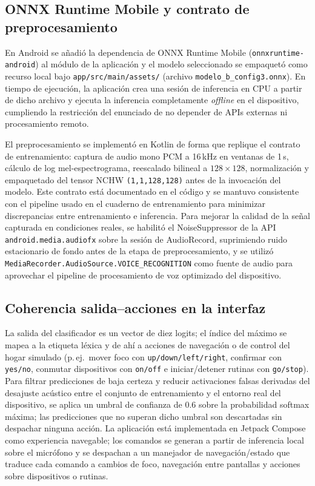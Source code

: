 \documentclass[conference]{IEEEtran}
\begin{document}
\subsection{ONNX Runtime Mobile y contrato de preprocesamiento}
En Android se a\~nadi\'o la dependencia de ONNX Runtime Mobile (\texttt{onnxruntime-android}) al m\'odulo de la aplicaci\'on y el modelo seleccionado se empaquet\'o como recurso local bajo \texttt{app/src/main/assets/} (archivo \texttt{modelo\_b\_config3.onnx}). En tiempo de ejecuci\'on, la aplicaci\'on crea una sesi\'on de inferencia en CPU a partir de dicho archivo y ejecuta la inferencia completamente \emph{offline} en el dispositivo, cumpliendo la restricci\'on del enunciado de no depender de APIs externas ni procesamiento remoto.

El preprocesamiento se implement\'o en Kotlin de forma que replique el contrato de entrenamiento: captura de audio mono PCM a 16\,kHz en ventanas de 1\,s, c\'alculo de log mel-espectrograma, reescalado bilineal a $128\times128$, normalizaci\'on y empaquetado del tensor NCHW \texttt{(1,1,128,128)} antes de la invocaci\'on del modelo. Este contrato est\'a documentado en el c\'odigo y se mantuvo consistente con el pipeline usado en el cuaderno de entrenamiento para minimizar discrepancias entre entrenamiento e inferencia. Para mejorar la calidad de la señal capturada en condiciones reales, se habilit\'o el NoiseSuppressor de la API \texttt{android.media.audiofx} sobre la sesión de AudioRecord, suprimiendo ruido estacionario de fondo antes de la etapa de preprocesamiento, y se utilizó \texttt{MediaRecorder.AudioSource.VOICE\_RECOGNITION} como fuente de audio para aprovechar el pipeline de procesamiento de voz optimizado del dispositivo.

\subsection{Coherencia salida--acciones en la interfaz}
La salida del clasificador es un vector de diez logits; el \'indice del m\'aximo se mapea a la etiqueta l\'exica y de ah\'i a acciones de navegaci\'on o de control del hogar simulado (p.\,ej.\ mover foco con \texttt{up/down/left/right}, confirmar con \texttt{yes/no}, conmutar dispositivos con \texttt{on/off} e iniciar/detener rutinas con \texttt{go/stop}). Para filtrar predicciones de baja certeza y reducir activaciones falsas derivadas del desajuste acústico entre el conjunto de entrenamiento y el entorno real del dispositivo, se aplica un umbral de confianza de 0.6 sobre la probabilidad softmax m\'axima; las predicciones que no superan dicho umbral son descartadas sin despachar ninguna acci\'on. La aplicaci\'on est\'a implementada en Jetpack Compose \cite{jetpack_compose} como experiencia navegable; los comandos se generan a partir de inferencia local sobre el micr\'ofono y se despachan a un manejador de navegaci\'on/estado que traduce cada comando a cambios de foco, navegaci\'on entre pantallas y acciones sobre dispositivos o rutinas.
\end{document}
